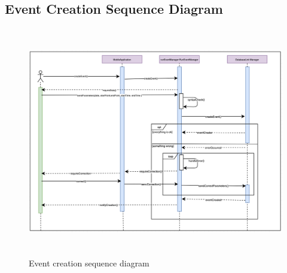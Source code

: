 \documentclass[DD.tex]{subfiles}
\begin{document}
\subsection{Event Creation Sequence Diagram}
\begin{figure}[h!]
\centering
\includegraphics[height=10.00cm,keepaspectratio]{Figures/EventCreation}
\caption{Event creation sequence diagram}
	
\end{figure}

\newpage
\end{document}
